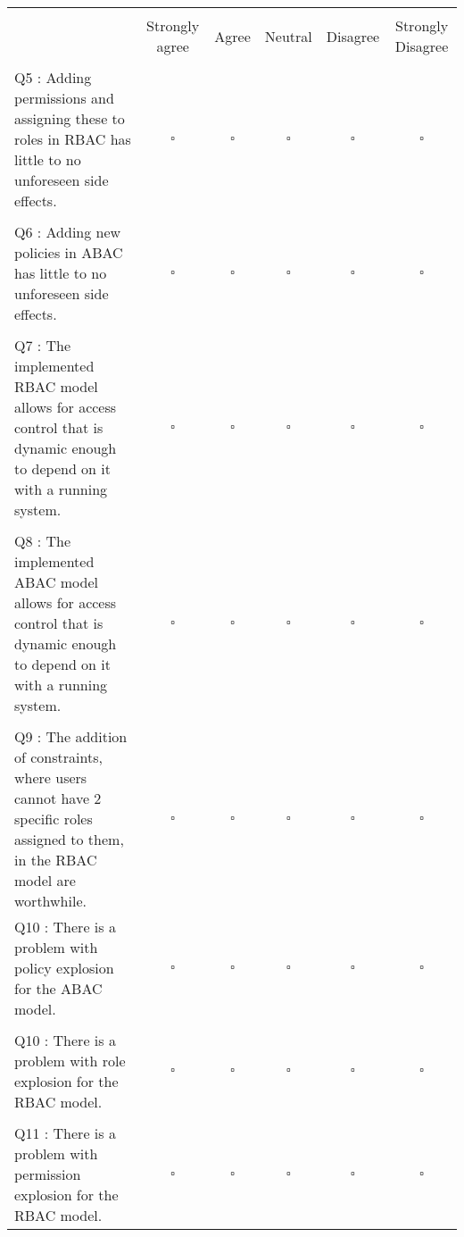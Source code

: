 \hskip-2.8cm\begin{tabular}{p{5cm} c c c c c}
    \multicolumn{6}{c}{} \\        
    & Strongly agree & Agree & Neutral  & Disagree & Strongly Disagree \\
    \\
    Q5 : Adding permissions and assigning these to roles in RBAC has little to no unforeseen side effects.
    & $\square$ & $\square$ & $\square$ & $\square$ & $\square$\\
    \\
    Q6 : Adding new policies in ABAC has little to no unforeseen side effects.
    & $\square$ & $\square$ & $\square$ & $\square$ & $\square$\\
    \\
    Q7 : The implemented RBAC model allows for access control that is dynamic enough to depend on it with a running system.
    & $\square$ & $\square$ & $\square$ & $\square$ & $\square$\\
    \\
    Q8 : The implemented ABAC model allows for access control that is dynamic enough to depend on it with a running system.
    & $\square$ & $\square$ & $\square$ & $\square$ & $\square$\\
    \\
    Q9 : The addition of constraints, where users cannot have 2 specific roles assigned to them, in the RBAC model are worthwhile.
    & $\square$ & $\square$ & $\square$ & $\square$ & $\square$\\
    Q10 : There is a problem with policy explosion for the ABAC model.
    & $\square$ & $\square$ & $\square$ & $\square$ & $\square$\\
    \\
    Q10 : There is a problem with role explosion for the RBAC model.
    & $\square$ & $\square$ & $\square$ & $\square$ & $\square$\\
    \\
    Q11 : There is a problem with permission explosion for the RBAC model.
    & $\square$ & $\square$ & $\square$ & $\square$ & $\square$\\
\end{tabular}

